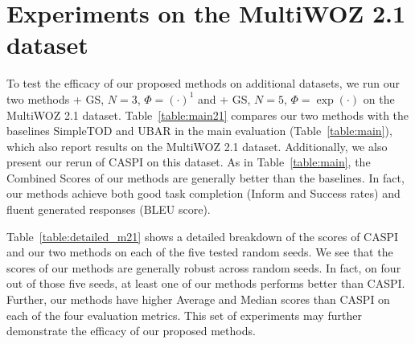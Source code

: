 \section{Experiments on the MultiWOZ 2.1 dataset} \label{sec:exp_multiwoz21}

To test the efficacy of our proposed methods on additional datasets, we run our two methods \rewardnet + GS, $N=3$, $\Phi=(\cdot)^{1}$  and \rewardmle + GS, $N=5$, $\Phi=\exp(\cdot)$ on the MultiWOZ 2.1 dataset.
Table~\ref{table:main21} compares our two methods with the baselines SimpleTOD and UBAR in the main evaluation (Table~\ref{table:main}), which also report results on the MultiWOZ 2.1 dataset.
Additionally, we also present our rerun of CASPI on this dataset.
As in Table~\ref{table:main}, the Combined Scores of our methods are generally better than the baselines.
In fact, our methods achieve both good task completion (Inform and Success rates) and fluent generated responses (BLEU score).

Table~\ref{table:detailed_m21} shows a detailed breakdown of the scores of CASPI and our two methods on each of the five tested random seeds.
We see that the scores of our methods are generally robust across random seeds.
In fact, on four out of those five seeds, at least one of our methods performs better than CASPI.
Further, our methods have higher Average and Median scores than CASPI on each of the four evaluation metrics.
This set of experiments may further demonstrate the efficacy of our proposed methods.


\begin{table}[H]
\captionsetup{font=small}
\caption{
\footnotesize{Results of the E2E response-generation task on the MultiWOZ 2.1 dataset.
The best result on each metric is bold.
The results of SimpleTOD and  UBAR are from the original paper.
The results of CASPI are from our reproduction.
All our provided results are the average over five random seeds.
``GS" denotes the Gumbel-softmax trick.
$(\cdot)^{1}$ denotes the power function with power $1$.}
} 
\label{table:main21} 
\centering 
\end{table}




